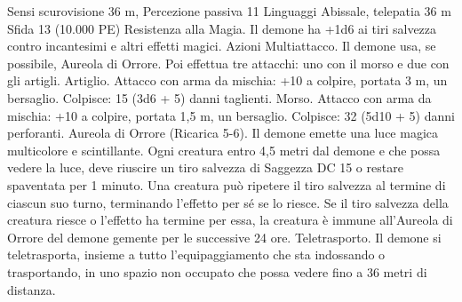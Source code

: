 \begin{multicols}{2}
Sensi scurovisione 36 m, Percezione passiva 11
Linguaggi Abissale, telepatia 36 m
Sfida 13 (10.000 PE)
Resistenza alla Magia. Il demone ha +1d6 ai tiri salvezza
contro incantesimi e altri effetti magici.
Azioni
Multiattacco. Il demone usa, se possibile, Aureola di Orrore. Poi
effettua tre attacchi: uno con il morso e due con gli artigli.
Artiglio. Attacco con arma da mischia: +10 a colpire, portata 3
m, un bersaglio.
Colpisce: 15 (3d6 + 5) danni taglienti.
Morso. Attacco con arma da mischia: +10 a colpire, portata 1,5
m, un bersaglio.
Colpisce: 32 (5d10 + 5) danni perforanti.
Aureola di Orrore (Ricarica 5-6). Il demone emette una luce
magica multicolore e scintillante. Ogni creatura entro 4,5 metri
dal demone e che possa vedere la luce, deve riuscire un tiro
salvezza di Saggezza DC 15 o restare spaventata per 1 minuto.
Una creatura può ripetere il tiro salvezza al termine di ciascun
suo turno, terminando l’effetto per sé se lo riesce. Se il tiro
salvezza della creatura riesce o l’effetto ha termine per essa, la
creatura è immune all’Aureola di Orrore del demone gemente
per le successive 24 ore.
Teletrasporto. Il demone si teletrasporta, insieme a tutto
l’equipaggiamento che sta indossando o trasportando, in uno
spazio non occupato che possa vedere fino a 36 metri di distanza.
 

\end{multicols}
